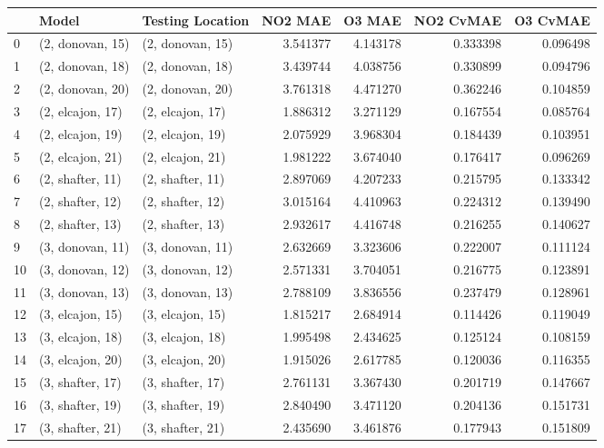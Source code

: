 \begin{tabular}{lllrrrr}
\toprule
{} &             Model &  Testing Location &   NO2 MAE &    O3 MAE &  NO2 CvMAE &  O3 CvMAE \\
\midrule
0  &  (2, donovan, 15) &  (2, donovan, 15) &  3.541377 &  4.143178 &   0.333398 &  0.096498 \\
1  &  (2, donovan, 18) &  (2, donovan, 18) &  3.439744 &  4.038756 &   0.330899 &  0.094796 \\
2  &  (2, donovan, 20) &  (2, donovan, 20) &  3.761318 &  4.471270 &   0.362246 &  0.104859 \\
3  &  (2, elcajon, 17) &  (2, elcajon, 17) &  1.886312 &  3.271129 &   0.167554 &  0.085764 \\
4  &  (2, elcajon, 19) &  (2, elcajon, 19) &  2.075929 &  3.968304 &   0.184439 &  0.103951 \\
5  &  (2, elcajon, 21) &  (2, elcajon, 21) &  1.981222 &  3.674040 &   0.176417 &  0.096269 \\
6  &  (2, shafter, 11) &  (2, shafter, 11) &  2.897069 &  4.207233 &   0.215795 &  0.133342 \\
7  &  (2, shafter, 12) &  (2, shafter, 12) &  3.015164 &  4.410963 &   0.224312 &  0.139490 \\
8  &  (2, shafter, 13) &  (2, shafter, 13) &  2.932617 &  4.416748 &   0.216255 &  0.140627 \\
9  &  (3, donovan, 11) &  (3, donovan, 11) &  2.632669 &  3.323606 &   0.222007 &  0.111124 \\
10 &  (3, donovan, 12) &  (3, donovan, 12) &  2.571331 &  3.704051 &   0.216775 &  0.123891 \\
11 &  (3, donovan, 13) &  (3, donovan, 13) &  2.788109 &  3.836556 &   0.237479 &  0.128961 \\
12 &  (3, elcajon, 15) &  (3, elcajon, 15) &  1.815217 &  2.684914 &   0.114426 &  0.119049 \\
13 &  (3, elcajon, 18) &  (3, elcajon, 18) &  1.995498 &  2.434625 &   0.125124 &  0.108159 \\
14 &  (3, elcajon, 20) &  (3, elcajon, 20) &  1.915026 &  2.617785 &   0.120036 &  0.116355 \\
15 &  (3, shafter, 17) &  (3, shafter, 17) &  2.761131 &  3.367430 &   0.201719 &  0.147667 \\
16 &  (3, shafter, 19) &  (3, shafter, 19) &  2.840490 &  3.471120 &   0.204136 &  0.151731 \\
17 &  (3, shafter, 21) &  (3, shafter, 21) &  2.435690 &  3.461876 &   0.177943 &  0.151809 \\

\end{tabular}
